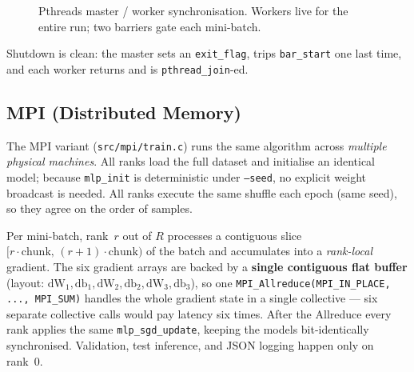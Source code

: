 \documentclass[11pt,a4paper]{article}
\begin{document}
\begin{figure}[H]
  \centering
  \caption{Pthreads master / worker synchronisation. Workers live for the
  entire run; two barriers gate each mini-batch.}
  \label{fig:pth}
\end{figure}

Shutdown is clean: the master sets an \texttt{exit\_flag}, trips
\texttt{bar\_start} one last time, and each worker returns and is
\texttt{pthread\_join}-ed.

\subsection{MPI (Distributed Memory)}\label{sec:mpi}

The MPI variant (\texttt{src/mpi/train.c}) runs the same algorithm across
\emph{multiple physical machines}. All ranks load the full dataset and
initialise an identical model; because \texttt{mlp\_init} is
deterministic under \texttt{--seed}, no explicit weight broadcast is
needed. All ranks execute the same shuffle each epoch (same seed), so
they agree on the order of samples.

Per mini-batch, rank~$r$ out of $R$ processes a contiguous slice
\([r\cdot\mathrm{chunk},\,(r{+}1)\cdot\mathrm{chunk})\) of the batch and
accumulates into a \emph{rank-local} gradient. The six gradient arrays are
backed by a \textbf{single contiguous flat buffer} (layout:
$\mathrm{dW}_1, \mathrm{db}_1, \mathrm{dW}_2, \mathrm{db}_2, \mathrm{dW}_3,
\mathrm{db}_3$), so one
\verb|MPI_Allreduce(MPI_IN_PLACE, ..., MPI_SUM)| handles the whole
gradient state in a single collective --- six separate collective calls
would pay latency six times. After the Allreduce every rank applies the
same \texttt{mlp\_sgd\_update}, keeping the models bit-identically
synchronised. Validation, test inference, and JSON logging happen only on
rank~0.
\end{document}
